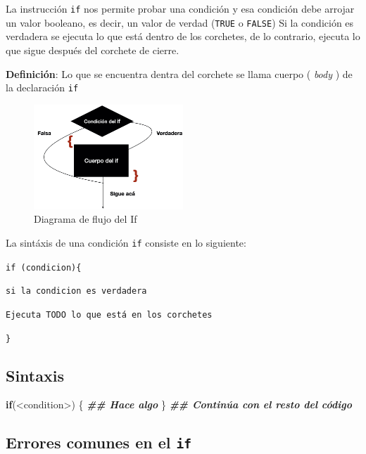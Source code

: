 \documentclass[
]{book}
\newenvironment{Shaded}{\begin{snugshade}}{\end{snugshade}}
\newcommand{\ControlFlowTok}[1]{\textcolor[rgb]{0.13,0.29,0.53}{\textbf{#1}}}
\newcommand{\DocumentationTok}[1]{\textcolor[rgb]{0.56,0.35,0.01}{\textbf{\textit{#1}}}}
\newcommand{\NormalTok}[1]{#1}
\newcommand{\SpecialCharTok}[1]{\textcolor[rgb]{0.00,0.00,0.00}{#1}}
\begin{document}
La instrucción \texttt{if} nos permite probar una condición y esa condición debe arrojar un valor booleano, es decir, un valor de verdad (\texttt{TRUE} o \texttt{FALSE}) Si la condición es verdadera se ejecuta lo que está dentro de los corchetes, de lo contrario, ejecuta lo que sigue después del corchete de cierre.

\textbf{Definición}: Lo que se encuentra dentra del corchete se llama cuerpo ( \emph{body} ) de la declaración \texttt{if}

\begin{figure}
\hypertarget{id}{%
\centering
\includegraphics[width=0.5\textwidth,height=0.5\textheight]{If_R.001.jpeg}
\caption{Diagrama de flujo del If}\label{id}
}
\end{figure}

La sintáxis de una condición \texttt{if} consiste en lo siguiente:

\texttt{if\ (condicion)\{}

\texttt{si\ la\ condicion\ es\ verdadera}

\texttt{Ejecuta\ TODO\ lo\ que\ está\ en\ los\ corchetes}

\texttt{\}}

\hypertarget{sintaxis}{%
\subsection{Sintaxis}\label{sintaxis}}

\begin{Shaded}
\begin{Highlighting}[]
\ControlFlowTok{if}\NormalTok{(}\SpecialCharTok{\textless{}}\NormalTok{condition}\SpecialCharTok{\textgreater{}}\NormalTok{) \{}
        \DocumentationTok{\#\# Hace algo}
\NormalTok{\} }
\DocumentationTok{\#\# Continúa con el resto del código}
\end{Highlighting}
\end{Shaded}

\hypertarget{errores-comunes-en-el-if}{%
\subsection{\texorpdfstring{Errores comunes en el \texttt{if}}{Errores comunes en el if}}\label{errores-comunes-en-el-if}}
\end{document}
